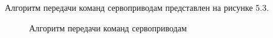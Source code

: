 Алгоритм передачи команд сервоприводам представлен на рисунке 5.3.

\begin{figure}[h!]
\caption{Алгоритм передачи команд сервоприводам}
\end{figure}